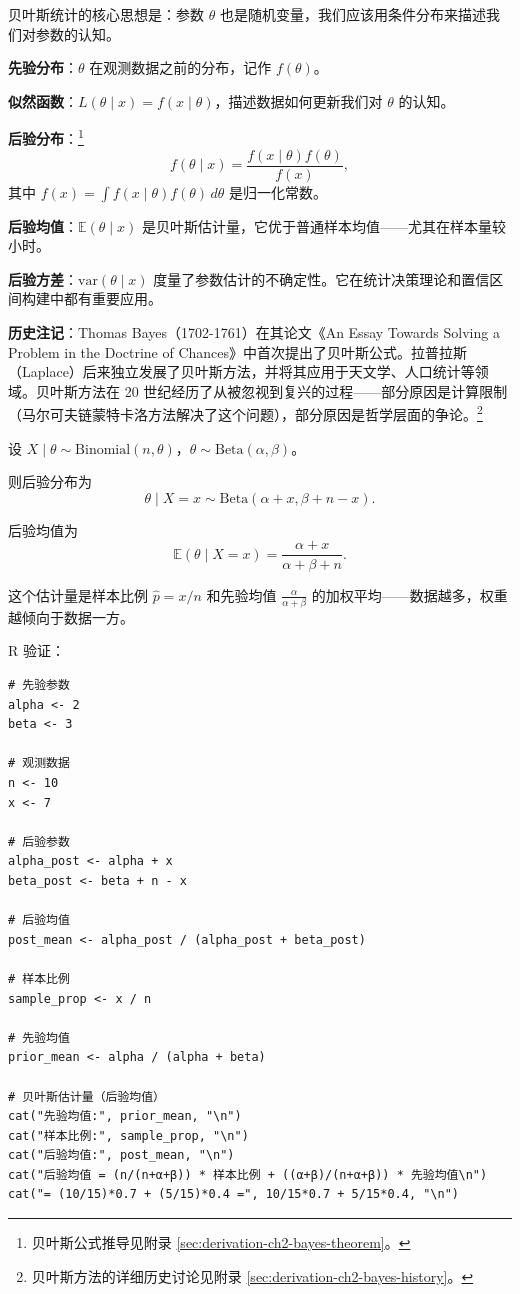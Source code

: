 贝叶斯统计的核心思想是：参数 $\theta$ 也是随机变量，我们应该用条件分布来描述我们对参数的认知。

\textbf{先验分布}：$\theta$ 在观测数据之前的分布，记作 $f(\theta)$。

\textbf{似然函数}：$L(\theta \mid x) = f(x \mid \theta)$，描述数据如何更新我们对 $\theta$ 的认知。

\textbf{后验分布}：\footnote{贝叶斯公式推导见附录 \cref{sec:derivation-ch2-bayes-theorem}。}
\[
f(\theta \mid x) = \frac{f(x \mid \theta) f(\theta)}{f(x)},
\]
其中 $f(x) = \int f(x \mid \theta) f(\theta) \, d\theta$ 是归一化常数。

\textbf{后验均值}：$\mathbb{E}(\theta \mid x)$ 是贝叶斯估计量，它优于普通样本均值——尤其在样本量较小时。

\textbf{后验方差}：$\text{var}(\theta \mid x)$ 度量了参数估计的不确定性。它在统计决策理论和置信区间构建中都有重要应用。

\textbf{历史注记}：Thomas Bayes（1702-1761）在其论文《An Essay Towards Solving a Problem in the Doctrine of Chances》中首次提出了贝叶斯公式。拉普拉斯（Laplace）后来独立发展了贝叶斯方法，并将其应用于天文学、人口统计等领域。贝叶斯方法在 20 世纪经历了从被忽视到复兴的过程——部分原因是计算限制（马尔可夫链蒙特卡洛方法解决了这个问题），部分原因是哲学层面的争论。\footnote{贝叶斯方法的详细历史讨论见附录 \cref{sec:derivation-ch2-bayes-history}。}

\begin{example}\label{ex:beta-binomial-conjugate-ch2}
设 $X \mid \theta \sim \text{Binomial}(n, \theta)$，$\theta \sim \text{Beta}(\alpha, \beta)$。

则后验分布为
\[
\theta \mid X = x \sim \text{Beta}(\alpha + x, \beta + n - x).
\]

后验均值为
\[
\mathbb{E}(\theta \mid X = x) = \frac{\alpha + x}{\alpha + \beta + n}.
\]

这个估计量是样本比例 $\hat{p} = x/n$ 和先验均值 $\frac{\alpha}{\alpha+\beta}$ 的加权平均——数据越多，权重越倾向于数据一方。

R 验证：
\begin{verbatim}
# 先验参数
alpha <- 2
beta <- 3

# 观测数据
n <- 10
x <- 7

# 后验参数
alpha_post <- alpha + x
beta_post <- beta + n - x

# 后验均值
post_mean <- alpha_post / (alpha_post + beta_post)

# 样本比例
sample_prop <- x / n

# 先验均值
prior_mean <- alpha / (alpha + beta)

# 贝叶斯估计量（后验均值）
cat("先验均值:", prior_mean, "\n")
cat("样本比例:", sample_prop, "\n")
cat("后验均值:", post_mean, "\n")
cat("后验均值 = (n/(n+α+β)) * 样本比例 + ((α+β)/(n+α+β)) * 先验均值\n")
cat("= (10/15)*0.7 + (5/15)*0.4 =", 10/15*0.7 + 5/15*0.4, "\n")
\end{verbatim}
\end{example}

